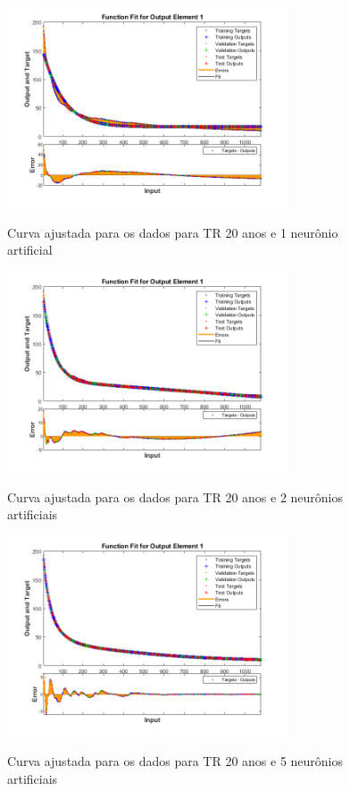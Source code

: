 \begin{figure}[H]
    \caption{Curva ajustada para os dados para TR 20 anos e 1 neurônio artificial}
    \centering
    \includegraphics[width=0.74\textwidth]{Textuais/Figuras/NN/tr20-1neuronio.png}
    \label{fig:tr20-1n}
\end{figure}

\begin{figure}[H]
    \caption{Curva ajustada para os dados para TR 20 anos e 2 neurônios artificiais}
    \centering
    \includegraphics[width=0.74\textwidth]{Textuais/Figuras/NN/tr20-2neuronio.png}
    \label{fig:tr20-2n}
\end{figure}

\begin{figure}[H]
    \caption{Curva ajustada para os dados para TR 20 anos e 5 neurônios artificiais}
    \centering
    \includegraphics[width=0.74\textwidth]{Textuais/Figuras/NN/tr20-5neuronio.png}
    \label{fig:tr20-5n}
\end{figure}


